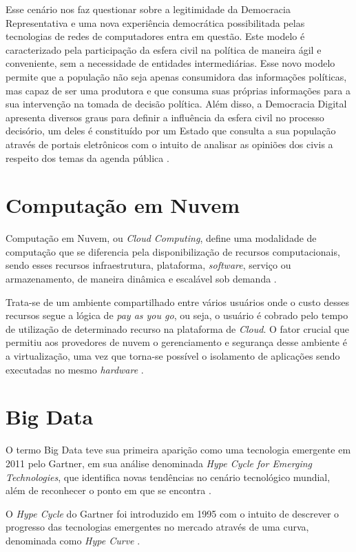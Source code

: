 Esse cenário nos faz questionar sobre a legitimidade da Democracia Representativa e uma nova experiência democrática possibilitada pelas tecnologias de redes de computadores entra em questão. Este modelo é caracterizado pela participação da esfera civil na política de maneira ágil e conveniente, sem a necessidade de entidades intermediárias. Esse novo modelo permite que a população não seja apenas consumidora das informações políticas, mas capaz de ser uma produtora e que consuma suas próprias informações para a sua intervenção na tomada de decisão política. Além disso, a Democracia Digital apresenta diversos graus para definir a influência da esfera civil no processo decisório, um deles 
é constituído por um Estado que consulta a sua população através de portais eletrônicos com o intuito de analisar as opiniões dos civis a respeito dos temas da agenda pública \cite{democraciadigital}.

\section{Computação em Nuvem} Computação em Nuvem, ou \textit{Cloud Computing}, define uma modalidade de computação que se diferencia pela disponibilização de recursos computacionais, sendo esses recursos infraestrutura, plataforma, \textit{software}, serviço ou armazenamento, de maneira dinâmica e escalável sob demanda \cite{cloudcomputing}. 

Trata-se de um ambiente compartilhado entre vários usuários onde o custo desses recursos segue a lógica de \textit{pay as you go}, ou seja, o usuário é cobrado pelo tempo de utilização de determinado recurso na plataforma de \textit{Cloud}. O fator crucial que permitiu aos provedores de nuvem o gerenciamento e segurança desse ambiente é a virtualização, uma vez que torna-se possível o isolamento de aplicações sendo executadas no mesmo \textit{hardware} \cite{cloudcomputing}.

\section{Big Data} O termo Big Data teve sua primeira aparição como uma tecnologia emergente em 2011 pelo Gartner, em sua análise denominada \textit{Hype Cycle for Emerging Technologies}, que identifica novas tendências no cenário tecnológico mundial, além de reconhecer o ponto em que se encontra \cite{bigdataincontext}.

O \textit{Hype Cycle} do Gartner foi introduzido em 1995 com o intuito de descrever o progresso das tecnologias emergentes no mercado através de uma curva, denominada como \textit{Hype Curve} \cite{understandinghypecicles}.

